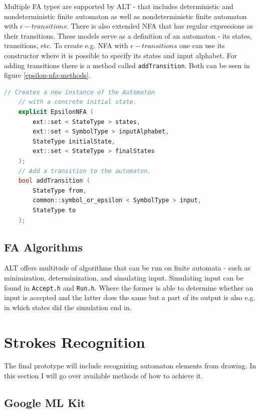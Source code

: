 Multiple FA types are supported by ALT - that includes deterministic and nondeterministic finite automaton as well as nondeterministic finite automaton with $\epsilon-transitions$. There is also extended NFA that has regular expressions as their transitions. These models serve as a definition of an automaton - its states, transitions, etc. To create e.g. NFA with $\epsilon-transitions$ one can use its constructor where it is possible to specify its states and input alphabet. For adding transitions there is a method called \lstinline{addTransition}. Both can be seen in figure \ref{epsilon-nfa-methods}.

\begin{lstlisting}[language=C++, caption=EpsilonNFA example methods, label=epsilon-nfa-methods]
    // Creates a new instance of the Automaton
    // with a concrete initial state.
    explicit EpsilonNFA ( 
        ext::set < StateType > states,
        ext::set < SymbolType > inputAlphabet, 
        StateType initialState, 
        ext::set < StateType > finalStates
    );
    // Add a transition to the automaton.
    bool addTransition ( 
        StateType from,
        common::symbol_or_epsilon < SymbolType > input,
        StateType to 
    );
\end{lstlisting}

\subsection{FA Algorithms}

ALT offers multitude of algorithms that can be run on finite automata - such as minimization, determinization, and simulating input. Simulating input can be found in \lstinline{Accept.h} and \lstinline{Run.h}. Where the former is able to determine whether an input is accepted and the latter does the same but a part of its output is also e.g. in which states did the simulation end in.

\section{Strokes Recognition}

The final prototype will include recognizing automaton elements from drawing. In this section I will go over available methods of how to achieve it.

\subsection{Google ML Kit}

